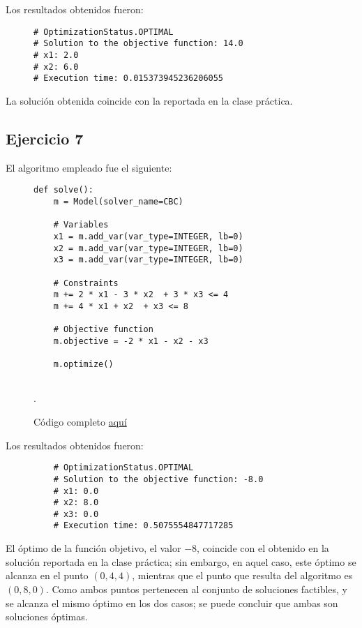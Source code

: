 \documentclass[titlepage, 11pt]{scrartcl}
\begin{document}
Los resultados obtenidos fueron:
\begin{figure}[H]
	\begin{verbatim}
# OptimizationStatus.OPTIMAL
# Solution to the objective function: 14.0
# x1: 2.0
# x2: 6.0
# Execution time: 0.015373945236206055
	\end{verbatim}
\end{figure}
La solución obtenida coincide con la reportada en la clase práctica.

\subsection{Ejercicio 7}
El algoritmo empleado fue el siguiente:
\begin{figure}[H]
	\begin{verbatim}
def solve():
	m = Model(solver_name=CBC)
	
	# Variables
	x1 = m.add_var(var_type=INTEGER, lb=0)
	x2 = m.add_var(var_type=INTEGER, lb=0)
	x3 = m.add_var(var_type=INTEGER, lb=0)
	
	# Constraints
	m += 2 * x1 - 3 * x2  + 3 * x3 <= 4
	m += 4 * x1 + x2  + x3 <= 8
	
	# Objective function
	m.objective = -2 * x1 - x2 - x3
	
	m.optimize()
	
	\end{verbatim}
	\caption{Código completo \href{ex7.py}{aquí}}.
\end{figure}

Los resultados obtenidos fueron:
\begin{figure}[H]
	\begin{verbatim}
	# OptimizationStatus.OPTIMAL
	# Solution to the objective function: -8.0
	# x1: 0.0
	# x2: 8.0
	# x3: 0.0
	# Execution time: 0.5075554847717285
	\end{verbatim}
\end{figure}
El óptimo de la función objetivo, el valor $-8$, coincide con el obtenido en la solución reportada en la clase práctica; sin embargo, en aquel caso, este óptimo se alcanza en el punto $(0, 4, 4)$, mientras que el punto que resulta del algoritmo es $(0, 8, 0)$. Como ambos puntos pertenecen al conjunto de soluciones factibles, y se alcanza el mismo óptimo en los dos casos; se puede concluir que ambas son soluciones óptimas.
\end{document}
